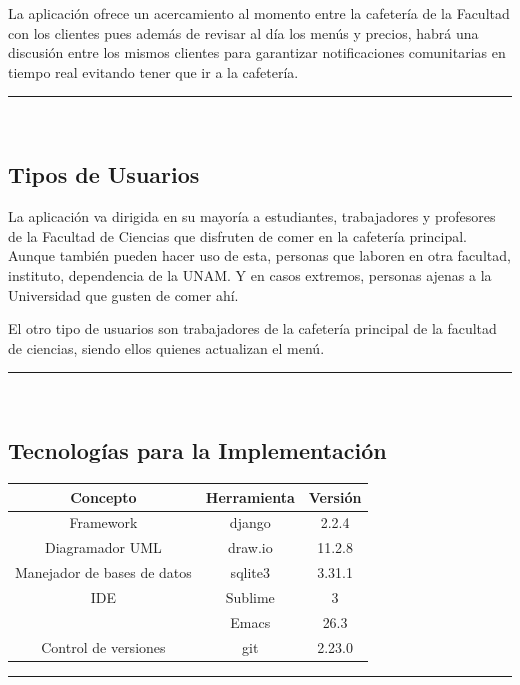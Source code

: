 \documentclass{article}
\begin{document}
La aplicación ofrece un acercamiento al momento entre la cafetería de la
Facultad con los clientes pues además de revisar al día los menús y precios,
habrá una discusión entre los mismos clientes para garantizar notificaciones
comunitarias en tiempo real evitando tener que ir a la cafetería.

\rule{0.8\textwidth}{.8pt}\\

\subsection*{Tipos de Usuarios}

La aplicación va dirigida en su mayoría a estudiantes, trabajadores y profesores
de la Facultad de Ciencias que disfruten de comer en la cafetería principal.
Aunque también pueden hacer uso de esta, personas que laboren en otra facultad,
instituto, dependencia de la UNAM. Y en casos extremos, personas ajenas a la
Universidad que gusten de comer ahí. 

El otro tipo de usuarios son trabajadores de la cafetería principal de la
facultad de ciencias, siendo ellos quienes actualizan el menú.

\rule{0.8\textwidth}{.8pt}\\

\subsection*{Tecnologías para la Implementación}

\begin{center}
  \begin{tabular}{| c | c | c |} \hline
    Concepto & Herramienta & Versión \\\hline
    Framework & django & 2.2.4 \\\hline
    Diagramador UML & draw.io & 11.2.8 \\\hline
    Manejador de bases de datos & sqlite3 & 3.31.1 \\\hline
    IDE & Sublime & 3 \\
    & Emacs & 26.3 \\\hline
    Control de versiones & git & 2.23.0 \\\hline
  \end{tabular}
\end{center}
\rule{0.8\textwidth}{.8pt}\\
\end{document}
